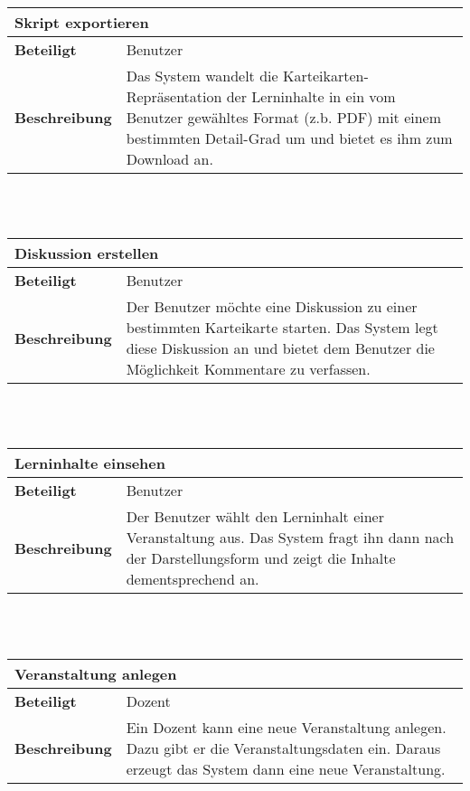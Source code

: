 \documentclass[12pt,a4paper]{article}
\begin{document}
\begin{tabular}{l p{10cm}}
\multicolumn{2}{l}{\textbf{Skript exportieren}} \\ \hline
\textbf{Beteiligt} & Benutzer \\ \hline 
\textbf{Beschreibung} & Das System wandelt die Karteikarten-Repräsentation der Lerninhalte in ein vom Benutzer gewähltes Format (z.b. PDF) mit einem bestimmten Detail-Grad um und bietet es ihm zum Download an. \\ 
\hline 
\end{tabular}\\\\

\begin{tabular}{l p{10cm}}
\multicolumn{2}{l}{\textbf{Diskussion erstellen}} \\ \hline
\textbf{Beteiligt} & Benutzer \\ \hline 
\textbf{Beschreibung} & Der Benutzer möchte eine Diskussion zu einer bestimmten Karteikarte starten. Das System legt diese Diskussion an und bietet dem Benutzer die Möglichkeit Kommentare zu verfassen. \\ 
\hline 
\end{tabular}\\\\

\begin{tabular}{l p{10cm}}
\multicolumn{2}{l}{\textbf{Lerninhalte einsehen}} \\ \hline
\textbf{Beteiligt} & Benutzer \\ \hline 
\textbf{Beschreibung} & Der Benutzer wählt den Lerninhalt einer Veranstaltung aus. Das System fragt ihn dann nach der Darstellungsform und zeigt die Inhalte dementsprechend an. \\ 
\hline 
\end{tabular}\\\\

\begin{tabular}{l p{10cm}}
\multicolumn{2}{l}{\textbf{Veranstaltung anlegen}} \\ \hline
\textbf{Beteiligt} & Dozent \\ \hline 
\textbf{Beschreibung} & Ein Dozent kann eine neue Veranstaltung anlegen. Dazu gibt er die Veranstaltungsdaten ein. Daraus erzeugt das System dann eine neue Veranstaltung.\\ 
\hline 
\end{tabular}\\\\
\end{document}
